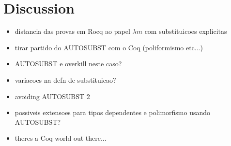 \chapter{Discussion}
\label{c:discussion}

\begin{itemize}

\item distancia das provas em Rocq ao papel
  \subitem $\lambda m$ com substituicoes explicitas

\item tirar partido do AUTOSUBST com o Coq (poliformismo etc...)
\item AUTOSUBST e overkill neste caso?
\item variacoes na defn de substituicao?
\item avoiding AUTOSUBST 2

\item possiveis extensoes para tipos dependentes e polimorfismo usando AUTOSUBST?

\item theres a Coq world out there...
  
\end{itemize}

